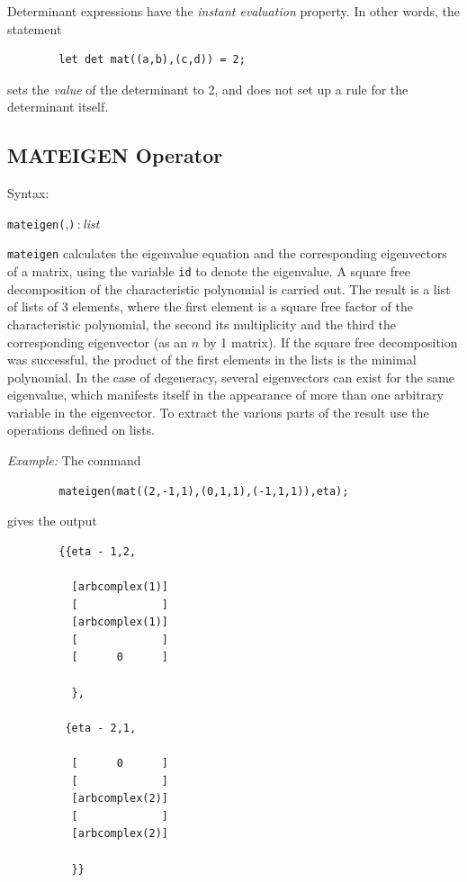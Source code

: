 Determinant expressions have the \emph{instant evaluation} property.
  In other words, the statement
\begin{verbatim}
        let det mat((a,b),(c,d)) = 2;
\end{verbatim}
sets the \emph{value} of the determinant to 2, and does not set up a rule
for the determinant itself.

\subsection{MATEIGEN Operator}
\hypertarget{operator:MATEIGEN}{}
Syntax:
\begin{syntax}
  \texttt{mateigen(},\texttt{)}\,:\,\textit{list}
\end{syntax}

\texttt{mateigen} calculates the eigenvalue equation and the corresponding
eigenvectors of a matrix, using the variable \texttt{id} to denote the
eigenvalue.  A square free decomposition of the characteristic polynomial
is carried out.  The result is a list of lists of 3 elements, where the
first element is a square free factor of the characteristic polynomial,
the second its multiplicity and the third the corresponding eigenvector
(as an $n$ by 1 matrix).  If the square free decomposition was
successful, the product of the first elements in the lists is the minimal
polynomial.  In the case of degeneracy, several eigenvectors can exist for
the same eigenvalue, which manifests itself in the appearance of more than
one arbitrary variable in the eigenvector.  To extract the various parts
of the result use the operations defined on lists.

\textit{Example:}
 The command
\begin{verbatim}
        mateigen(mat((2,-1,1),(0,1,1),(-1,1,1)),eta);
\end{verbatim}
gives the output
\begin{verbatim}
        {{eta - 1,2,

          [arbcomplex(1)]
          [             ]
          [arbcomplex(1)]
          [             ]
          [      0      ]

          },

         {eta - 2,1,

          [      0      ]
          [             ]
          [arbcomplex(2)]
          [             ]
          [arbcomplex(2)]

          }}
\end{verbatim}

